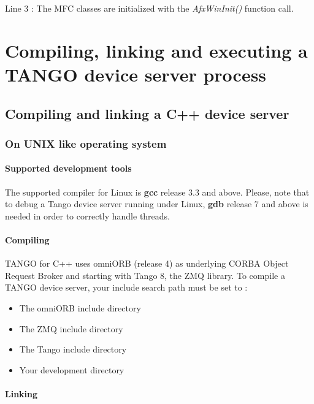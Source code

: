 Line 3 : The MFC classes are initialized with the \emph{AfxWinInit()}
function call.


\section{Compiling, linking and executing a TANGO device server process\label{sec:Compiling,-linking-and}}


\subsection{Compiling and linking a C++ device server}


\subsubsection{On UNIX like operating system }


\paragraph{Supported development tools}

The supported compiler for Linux is \textbf{gcc} release
3.3 and above. Please, note that to debug a Tango device server running
under Linux, \textbf{gdb} release 7 and
above is needed in order to correctly handle threads.


\paragraph{Compiling}

TANGO for C++ uses omniORB (release 4) as underlying CORBA Object
Request Broker \cite{OOC page} and starting with Tango 8, the ZMQ
library. To compile a TANGO device server, your include search path
must be set to :
\begin{itemize}
\item The omniORB include directory
\item The ZMQ include directory
\item The Tango include directory
\item Your development directory
\end{itemize}

\paragraph{Linking }

